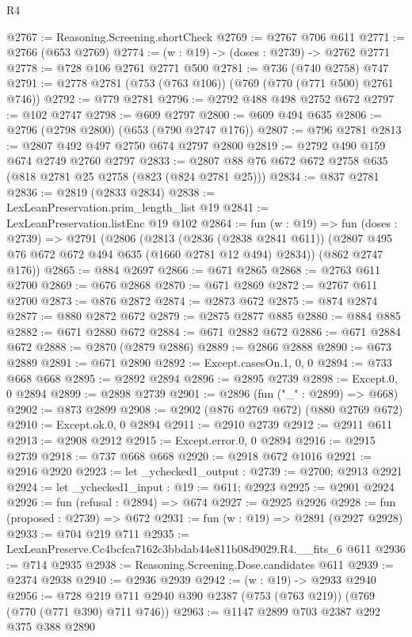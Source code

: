 \begin{lexlean}{R4}
\begin{coremodule}
@2767 := Reasoning.Screening.shortCheck
@2769 := @2767 @706 @611
@2771 := @2766 (@653 @2769)
@2774 := (w : @19) -> (doses : @2739) -> @2762 @2771
@2778 := @728 @106 @2761 @2771 @500
@2781 := @736 (@740 @2758) @747
@2791 := @2778 @2781 (@753 (@763 @106)) (@769 (@770 (@771 @500) @2761 @746))
@2792 := @779 @2781
@2796 := @2792 @488 @498 @2752 @672
@2797 := @102 @2747
@2798 := @609 @2797
@2800 := @609 @494 @635
@2806 := @2796 (@2798 @2800) (@653 (@790 @2747 @176))
@2807 := @796 @2781
@2813 := @2807 @492 @497 @2750 @674 @2797 @2800
@2819 := @2792 @490 @159 @674 @2749 @2760 @2797
@2833 := @2807 @88 @76 @672 @672 @2758 @635 (@818 @2781 @25 @2758 (@823 (@824 @2781 @25)))
@2834 := @837 @2781
@2836 := @2819 (@2833 @2834)
@2838 := LexLeanPreservation.prim_length_list @19
@2841 := LexLeanPreservation.listEnc @19 @102
@2864 := fun (w : @19) =>
  fun (doses : @2739) =>
  @2791
    (@2806
      (@2813
        (@2836 (@2838 @2841 @611))
        (@2807 @495 @76 @672 @672 @494 @635 (@1660 @2781 @12 @494) @2834))
      (@862 @2747 @176))
@2865 := @884 @2697
@2866 := @671 @2865
@2868 := @2763 @611 @2700
@2869 := @676 @2868
@2870 := @671 @2869
@2872 := @2767 @611 @2700
@2873 := @876 @2872
@2874 := @2873 @672
@2875 := @874 @2874
@2877 := @880 @2872 @672
@2879 := @2875 @2877 @885
@2880 := @884 @885
@2882 := @671 @2880 @672
@2884 := @671 @2882 @672
@2886 := @671 @2884 @672
@2888 := @2870 (@2879 @2886)
@2889 := @2866 @2888
@2890 := @673 @2889
@2891 := @671 @2890
@2892 := Except.casesOn.{1, 0, 0}
@2894 := @733 @668 @668
@2895 := @2892 @2894
@2896 := @2895 @2739
@2898 := Except.{0, 0} @2894
@2899 := @2898 @2739
@2901 := @2896 (fun ("_" : @2899) => @668)
@2902 := @873 @2899
@2908 := @2902 (@876 @2769 @672) (@880 @2769 @672)
@2910 := Except.ok.{0, 0} @2894
@2911 := @2910 @2739
@2912 := @2911 @611
@2913 := @2908 @2912
@2915 := Except.error.{0, 0} @2894
@2916 := @2915 @2739
@2918 := @737 @668 @668
@2920 := @2918 @672 @1016
@2921 := @2916 @2920
@2923 := let _ychecked1_output : @2739 := @2700; @2913 @2921
@2924 := let _ychecked1_input : @19 := @611; @2923
@2925 := @2901 @2924
@2926 := fun (refusal : @2894) => @674
@2927 := @2925 @2926
@2928 := fun (proposed : @2739) => @672
@2931 := fun (w : @19) => @2891 (@2927 @2928)
@2933 := @704 @219 @711
@2935 := LexLeanPreserve.Cc4bcfca7162c3bbdab44e811b08d9029.R4.__fits_6 @611
@2936 := @714 @2935
@2938 := Reasoning.Screening.Dose.candidates @611
@2939 := @2374 @2938
@2940 := @2936 @2939
@2942 := (w : @19) -> @2933 @2940
@2956 := @728 @219 @711 @2940 @390 @2387 (@753 (@763 @219)) (@769 (@770 (@771 @390) @711 @746))
@2963 := @1147 @2899 @703 @2387 @292 @375 @388 @2890

\end{coremodule}
\end{lexlean}
